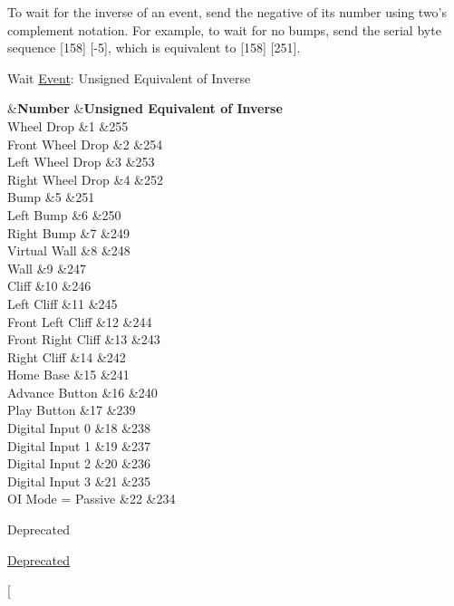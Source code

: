 \begin{Desc}
\begin{description}
To wait for the inverse of an event, send the negative of its number using two’s complement notation. For example, to wait for no bumps, send the serial byte sequence \mbox{[}158\mbox{]} \mbox{[}-\/5\mbox{]}, which is equivalent to \mbox{[}158\mbox{]} \mbox{[}251\mbox{]}.

Wait \hyperlink{structEvent}{Event}\+: Unsigned Equivalent of Inverse \begin{TabularC}{3}
\hline
{}&{\bf Number }&{\bf Unsigned Equivalent of Inverse  }\\
Wheel Drop &1 &255 \\
Front Wheel Drop &2 &254 \\
Left Wheel Drop &3 &253 \\
Right Wheel Drop &4 &252 \\
Bump &5 &251 \\
Left Bump &6 &250 \\
Right Bump &7 &249 \\
Virtual Wall &8 &248 \\
Wall &9 &247 \\
Cliff &10 &246 \\
Left Cliff &11 &245 \\
Front Left Cliff &12 &244 \\
Front Right Cliff &13 &243 \\
Right Cliff &14 &242 \\
Home Base &15 &241 \\
Advance Button &16 &240 \\
Play Button &17 &239 \\
Digital Input 0 &18 &238 \\
Digital Input 1 &19 &237 \\
Digital Input 2 &20 &236 \\
Digital Input 3 &21 &235 \\
O\+I Mode = Passive &22 &234 \\
\end{TabularC}
\begin{DoxyRefDesc}{Deprecated}
\item[\hyperlink{deprecated__deprecated000010}{Deprecated}]\end{DoxyRefDesc}
\item[{\em 
}
\end{description}
\end{Desc}
